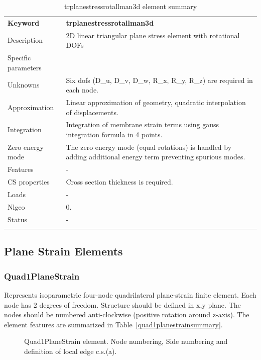\documentclass[a4paper]{article}
\newcommand{\templabel}{}%
\newcommand{\tempcaption}{}%
\newcounter{nelpar}
\newenvironment{elementsummary}[5]{%
  \gdef\tempcaption{#4}%
  \gdef\templabel{#5}%
  \setcounter{nelpar}{0}%
  \begin{center} %
    \begin{table}[!htb] %
      \begin{tabular}{|l|p{9cm}|}\hline %
        {\bf Keyword} & \bf{#1}\\ %
        {Description} & {#2}\\ %
        {Specific parameters} & {#3}\\ \hline %
}{
  \\ \hline %
      \end{tabular}%
      \caption{\tempcaption}%
      \label{\templabel}%
    \end{table}%
  \end{center}%
}
\newcommand{\elementDescription}[2]{{#1} & {#2}\\}
\begin{document}
\begin{elementsummary}{trplanestressrotallman3d}{2D linear triangular plane stress element with rotational DOFs}{}{trplanestressrotallman3d element summary}{trplanestressrotallman3dsummary}
\elementDescription{Unknowns}{Six dofs (D\_u, D\_v, D\_w, R\_x, R\_y, R\_z) are required in each node.}
\elementDescription{Approximation}{Linear approximation of geometry, quadratic interpolation of displacements.}
\elementDescription{Integration}{Integration of membrane strain terms using gauss integration formula in 4 points.}
\elementDescription{Zero energy mode}{The zero energy mode (equal rotations) is handled by adding additional energy term preventing spurious modes.}

\elementDescription{Features}{-}
\elementDescription{CS properties}{Cross section thickness is required.}
\elementDescription{Loads}{-}
\elementDescription{Nlgeo}{0.}
\elementDescription{Status}{-}
\end{elementsummary}


\clearpage
\subsection{Plane Strain Elements}

\subsubsection{Quad1PlaneStrain}
Represents isoparametric four-node quadrilateral plane-strain
finite element. Each node has 2 degrees of freedom.
Structure should be defined in x,y plane. 
The nodes should be numbered anti-clockwise (positive rotation around
z-axis). The element features are summarized in Table~\ref{quad1planestrainsummary}.

\begin{figure}[htb]
 \centering
 \begin{makeimage}
  
 \end{makeimage}
 \caption{Quad1PlaneStrain element. Node numbering, Side numbering and
 definition of local edge c.s.(a).}
 \label{Quad1PlaneStrainfig}
\end{figure}
\end{document}
